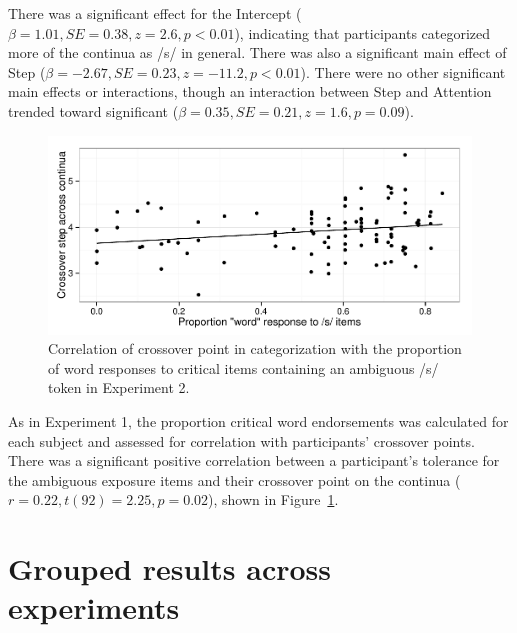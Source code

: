 \documentclass[11pt]{article}\usepackage[]{graphicx}\usepackage[]{color}
\begin{document}
There was a significant effect for the Intercept ($\beta = 1.01, SE = 0.38, z = 2.6, p < 0.01$), indicating that participants categorized more of the continua as /s/ in general.  There was also a significant main effect of Step ($\beta = -2.67, SE = 0.23, z = -11.2, p < 0.01$).  There were no other significant main effects or interactions, though an interaction between Step and Attention trended toward significant ($\beta = 0.35, SE = 0.21, z = 1.6, p = 0.09$).

\begin{figure}[!ht]

\caption{Correlation of crossover point in categorization with the proportion of word responses to critical items containing an ambiguous /s/ token in Experiment 2.}\label{fig:exp2xover}
\begin{center}
\includegraphics[width=\textwidth]{graphs/exp2_xoverwordresp}
\end{center}
\end{figure}

As in Experiment 1,  the proportion critical word endorsements was calculated for each subject and assessed for correlation with participants' crossover points. There was a significant positive correlation between a participant's tolerance for the ambiguous exposure items and their crossover point on the continua ($r = 0.22, t (92) = 2.25, p = 0.02$), shown in Figure~\ref{fig:exp2xover}.  

\section{Grouped results across experiments}
\end{document}
